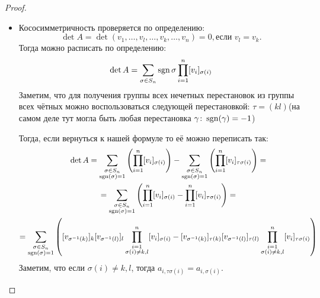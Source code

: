 \begin{proof}
\begin{enumerate}
\begin{itemize}
                \item Кососимметричность проверяется по определению:
                    \[
                    \det A = \det(v_1,\dots, v_l,\dots, v_k,\dots, v_n) = 0, \text{если } v_l = v_k.
                    \]
                    Тогда можно расписать по определению:
                    \[
                        \det A = \sum\limits_{\sigma\in S_n}^{}{\operatorname{sgn}\sigma\prod\limits_{i=1}^{n}[v_i]_{\sigma(i)}}
                    \]
                    Заметим, что для получения группы всех нечетных перестановок из группы всех 
                    чётных можно воспользоваться следующей перестановкой: $\tau=(kl)$(на самом
                    деле тут могла быть любая перестановка $\gamma\colon \operatorname{sgn}(\gamma) = -1$)

                    Тогда, если вернуться к нашей формуле то её можно переписать так:
                    \[
                    \begin{gathered}
                        \det A = 
                        \sum\limits_{\substack{\sigma\in S_n\\\operatorname{sgn}(\sigma)=1}}
                        \left(\prod\limits_{i=1}^{n}[v_i]_{\sigma(i)}\right)
                            - 
                        \sum\limits_{\substack{\sigma\in S_n\\\operatorname{sgn}(\sigma)=1}}
                        \left(\prod\limits_{i=1}^{n}[v_i]_{\tau\sigma(i)}\right) =
                        \\
                        = 
                        \sum\limits_{\substack{\sigma\in S_n\\\operatorname{sgn}(\sigma)=1}}
                        \left(\prod\limits_{i=1}^{n}[v_i]_{\sigma(i)}- \prod\limits_{i=1}^{n}[v_i]_{\tau\sigma(i)}\right) =
                        \\
                        = 
                        \sum\limits_{\substack{\sigma\in S_n\\\operatorname{sgn}(\sigma)=1}}
                        \left([v_{\sigma^{-1}(k)}]_k [v_{\sigma^{-1}(l)}]_l \prod\limits_{\substack{i=1\\\sigma(i)\not=k,l}}^{n}[v_i]_{\sigma(i)}-
                        [v_{\sigma^{-1}(k)}]_{\tau(k)} [v_{\sigma^{-1}(l)}]_{\tau(l)} \prod\limits_{\substack{i=1\\\sigma(i)\not=k,l}}^{n}[v_i]_{\tau\sigma(i)}\right)
                    \end{gathered}
                    \]
                    Заметим, что если $\sigma(i)\not= k,l$, тогда $a_{i, \tau\sigma(i)} = a_{i,\sigma(i)}$.

\end{itemize}
\end{enumerate}
\end{proof}

